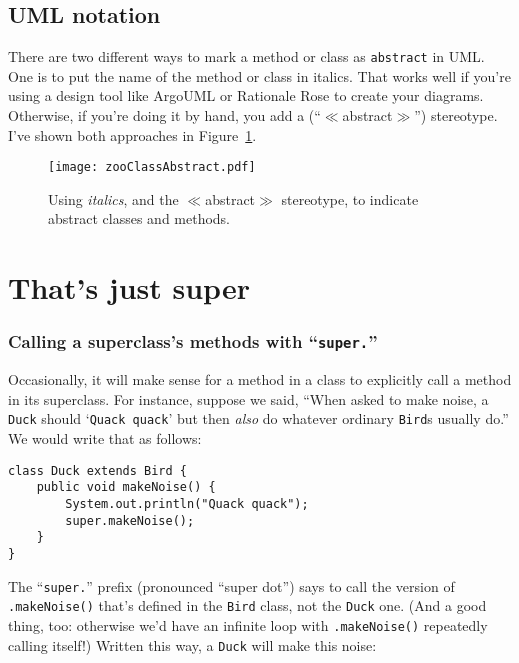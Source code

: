 \subsection{UML notation}

There are two different ways to mark a method or class as \texttt{abstract} in
UML. One is to put the name of the method or class in italics. That works well
if you're using a design tool like ArgoUML or Rationale Rose to create your
diagrams. Otherwise, if you're doing it by hand, you add a
(``$\ll$abstract$\gg$'') stereotype. I've shown both approaches in
Figure~\ref{fig:zooClassAbstract}.

\begin{figure}
\centering
\texttt{[image: zooClassAbstract.pdf]}
\caption{Using \textit{italics}, and the $\ll$abstract$\gg$ stereotype, to
indicate abstract classes and methods.}
\label{fig:zooClassAbstract}
\end{figure}

\section{That's just super}

\subsubsection{Calling a superclass's methods with ``\texttt{super.}''}

Occasionally, it will make sense for a method in a class to explicitly call a
method in its superclass. For instance, suppose we said, ``When asked to make
noise, a \texttt{Duck} should `\texttt{Quack quack}' but then \textit{also} do
whatever ordinary \texttt{Bird}s usually do.'' We would write that as follows:

\begin{Verbatim}[fontsize=\footnotesize,samepage=true,frame=single]
class Duck extends Bird {
    public void makeNoise() {
        System.out.println("Quack quack");
        super.makeNoise();
    }
}
\end{Verbatim}

The ``\texttt{super.}'' prefix (pronounced ``super dot'') says to call the
version of \texttt{.makeNoise()} that's defined in the \texttt{Bird}
class, not the \texttt{Duck} one. (And a good thing, too: otherwise we'd have
an infinite loop with \texttt{.makeNoise()} repeatedly calling itself!)
Written this way, a \texttt{Duck} will make this noise:

